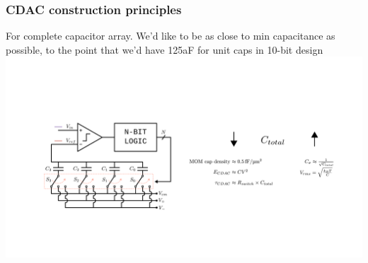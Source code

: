 \documentclass[aspectratio=169]{beamer}
\begin{document}


\begin{frame}
  \frametitle{CDAC construction principles}
  For complete capacitor array. We'd like to be as close to min capacitance as possible, to the point that we'd have 125aF for unit caps in 10-bit design
  \includegraphics[width=\textwidth]{tranchar5.pdf}
\end{frame}
\end{document}
